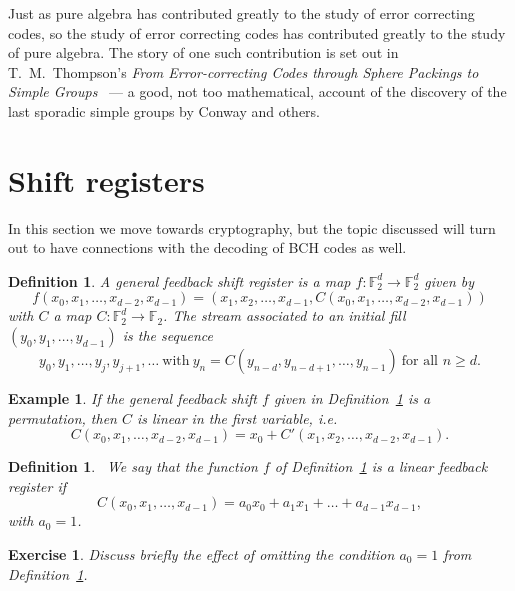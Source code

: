 \documentclass[12pt,a4paper]{article}
\theoremstyle{plain}
\newtheorem{definition}[theorem]{Definition}
\newtheorem{example}[theorem]{Example}
\newtheorem{exercise}[theorem]{Exercise}
\theoremstyle{definition}
\begin{document}
Just as pure algebra has contributed greatly
to the study of error correcting codes, so
the study of error correcting codes  has contributed
greatly to the study of pure algebra.
The story of one such contribution is set out
in T.~M.~Thompson's
\emph{From Error-correcting Codes through Sphere Packings
to Simple Groups}~\cite{Thompson} --- a good, not too
mathematical, account of
the discovery of the last
sporadic simple groups by Conway and others.
\section{Shift registers}\label{section shift}
In this section we move
towards cryptography, but the topic discussed will
turn out to have connections with the decoding
of BCH codes as well.

\begin{definition}\label{general feed}
A \emph{general feedback shift register} is a map
$f:{\mathbb F}_{2}^{d}\rightarrow {\mathbb F}_{2}^{d}$
given by
\[f(x_{0},x_{1},\dots,x_{d-2},x_{d-1})
=(x_{1},x_{2},\dots,x_{d-1},C(x_{0},x_{1},\dots,x_{d-2},x_{d-1}))\]
with $C$ a map $C:{\mathbb F}_{2}^{d}\rightarrow {\mathbb F}_{2}$.
The \emph{stream} associated to an \emph{initial fill}
$(y_{0},y_{1},\dots,y_{d-1})$ is the sequence
\[y_{0},y_{1},\dots,y_{j},y_{j+1},\dots
\ \text{with}\ y_{n}=C(y_{n-d},y_{n-d+1},\dots,y_{n-1})
\ \text{for all $n\geq d$.}\]
\end{definition}

\begin{example} If the general feedback shift $f$
given in Definition~\ref{general feed} is a permutation,
then $C$ is linear in the first variable, i.e.
\[C(x_{0},x_{1},\dots,x_{d-2},x_{d-1})
=x_{0}+C'(x_{1},x_{2},\dots,x_{d-2},x_{d-1}).\]
\end{example}
\begin{definition}~\label{linear feed}
We say that the function $f$
of Definition~\ref{general feed} is
a \emph{linear feedback register} if
\[C(x_{0},x_{1},\dots,x_{d-1})=
a_{0}x_{0}+a_{1}x_{1}+\ldots+a_{d-1}x_{d-1},\]
with $a_{0}=1$.
\end{definition}
\begin{exercise} Discuss briefly the effect
of omitting the condition
$a_{0}=1$ from Definition~\ref{linear feed}.
\end{exercise}
\end{document}

